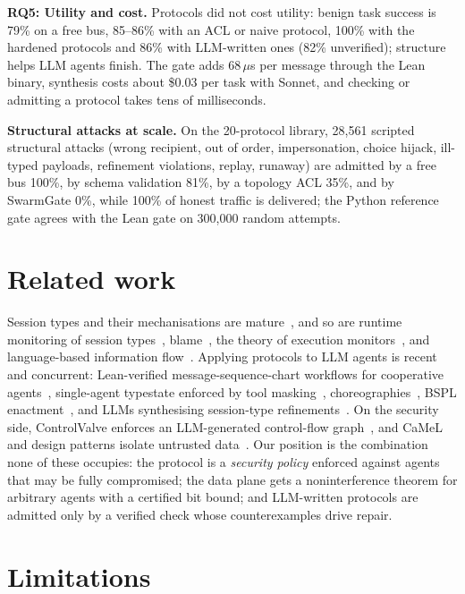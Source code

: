 \documentclass[10pt,twocolumn]{article}
\begin{document}
\textbf{RQ5: Utility and cost.} Protocols did not cost utility: benign task success is 79\% on a free bus, 85--86\%
with an ACL or naive protocol, 100\% with the hardened protocols and 86\% with LLM-written ones (82\% unverified);
structure helps LLM agents finish. The gate adds 68\,$\mu$s per message through the Lean binary, synthesis costs
about \$0.03 per task with Sonnet, and checking or admitting a protocol takes tens of milliseconds.

\textbf{Structural attacks at scale.} On the 20-protocol library, 28{,}561 scripted structural attacks (wrong
recipient, out of order, impersonation, choice hijack, ill-typed payloads, refinement violations, replay, runaway)
are admitted by a free bus 100\%, by schema validation 81\%, by a topology ACL 35\%, and by SwarmGate 0\%, while
100\% of honest traffic is delivered; the Python reference gate agrees with the Lean gate on 300{,}000 random
attempts.

\section{Related work}

Session types and their mechanisations are mature~\cite{honda2016mpst,castroperez2021zooid}, and so are runtime
monitoring of session types~\cite{bocchi2017monitoring,larsen2026nest}, blame~\cite{jia2016blame}, the theory of
execution monitors~\cite{schneider2000enforceable,ligatti2005edit}, and language-based information
flow~\cite{sabelfeld2003language,capecchi2016ifsafety}. Applying protocols to LLM agents is recent and concurrent:
Lean-verified message-sequence-chart workflows for cooperative agents~\cite{bollig2026provable}, single-agent
typestate enforced by tool masking~\cite{sikaroudi2026concordat}, choreographies~\cite{gopinathan2026pact}, BSPL
enactment~\cite{joshi2026ahoy}, and LLMs synthesising session-type refinements~\cite{li2026syntropy}. On the
security side, ControlValve enforces an LLM-generated control-flow graph~\cite{jha2026controlvalve}, and CaMeL and
design patterns isolate untrusted data~\cite{debenedetti2025camel,beurerkellner2025designpatterns}. Our position
is the combination none of these occupies: the protocol is a \emph{security policy} enforced against agents that
may be fully compromised; the data plane gets a noninterference theorem for arbitrary agents with a certified bit
bound; and LLM-written protocols are admitted only by a verified check whose counterexamples drive repair.

\section{Limitations}\label{sec:lim}
\end{document}
